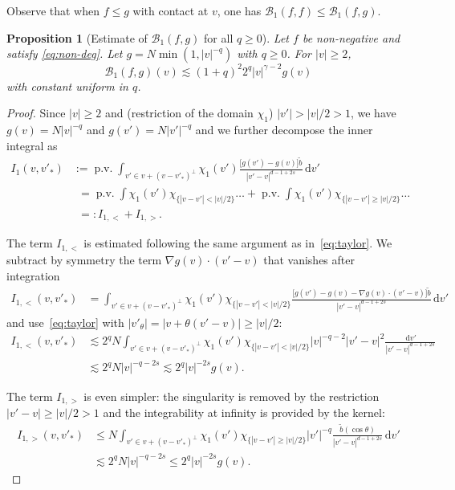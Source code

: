 \documentclass[11pt]{article}
\theoremstyle{plain}
\newtheorem{prop}[thm]{Proposition}
\theoremstyle{definition}
\numberwithin{equation}{section}
\newcommand{\dd} {\, \mathrm{d}}
\DeclareMathOperator{\PV}{p.v.}
\let\A N
\begin{document}
Observe that when $f \le g$ with contact at $v$, one has
$\mathcal{B}_1(f,f) \le \mathcal{B}_1(f,g)$.
\begin{prop}[Estimate of {$\mathcal{B}_1(f,g)$} for all $q \ge
0$] \label{prop:B1} Let $f$ be non-negative and satisfy \eqref{eq:non-deg}. Let
$g = \A \min(1,|v|^{-q})$ with $q \ge 0$. For $|v| \ge 2$,
\[ \mathcal{B}_1 (f,g)(v) \lesssim (1+q)^2 2^q |v|^{\gamma -2} g(v)\]
with constant uniform in $q$.
\end{prop}

\begin{proof}
Since $|v|\ge 2$ and (restriction of the domain $\chi_1$)
$|v'| > |v|/2 >1$, we have $g(v) = N |v|^{-q}$ and
$g(v') = N |v'|^{-q}$ and we further decompose the inner integral as
\begin{align*}
I_1(v,v'_*) &:= \PV \int_{v' \in v + (v-v'_*)^\bot} \chi_1
(v') \frac{\big[
g(v')-g(v) \big] \tilde b}{|v'-v|^{d-1+2s}} \dd v' \\
&\phantom{:}= \PV \int \chi_1(v')
\chi_{\{|v-v'| < |v|/2\}} \dots + \PV \int \chi_1(v')
\chi_{\{|v-v'| \ge |v|/2\}} \dots \\
&\phantom{:}=: I_{1,<} + I_{1,>}.
\end{align*}

The term $I_{1,<}$ is estimated following the same argument as
in~\eqref{eq:taylor}. We subtract by symmetry the term
$\nabla g(v) \cdot (v'-v)$ that vanishes after integration
\begin{align*}
I_{1,<}(v,v'_*) & = \int_{v' \in v + (v-v'_*)^\bot} \chi_1
(v') \chi_{\{|v-v'| < |v|/2\}} \frac{\big[ g(v')-g(v) - \nabla g (v) \cdot (v'-v) \big]
\tilde b}{|v'-v|^{d-1+2s}} \dd v'
\end{align*}
and use~\eqref{eq:taylor} with $|v'_\theta| = |v+\theta (v'-v)| \ge |v|/2$:
\begin{align*}
I_{1,<}(v,v'_*) & \lesssim 2^q \A \int_{v' \in v + (v-v'_*)^\bot}
\chi_1(v') \chi_{\{|v-v'| < |v|/2\}} |v|^{-q-2} |v'-v|^2 \frac{\dd v'}{|v'-v|^{d-1+2s}}\\
& \lesssim 2^q \A |v|^{-q-2s} \lesssim 2^q |v|^{-2s} g(v).
\end{align*}

The term $I_{1,>}$ is even simpler: the singularity is removed by the
restriction $|v'-v| \ge |v|/2 >1$ and the integrability at infinity is
provided by the kernel:
\begin{align*}
I_{1,>}(v,v'_*) & \le \A \int_{v' \in v + (v-v'_*)^\bot} \chi_1(v') \chi_{\{|v-v'| \ge |v|/2\}}
|v'|^{-q} \frac{\tilde b(\cos \theta)}{|v'-v|^{d-1+2s}}
\dd v'\\
& \lesssim 2^q \A |v|^{-q-2s} \le 2^q |v|^{-2s} g(v).
\end{align*}


\end{proof}
\end{document}
